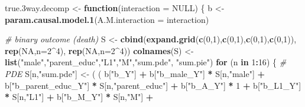 \documentclass[
]{book}
\newenvironment{Shaded}{\begin{snugshade}}{\end{snugshade}}
\newcommand{\AttributeTok}[1]{\textcolor[rgb]{0.13,0.29,0.53}{#1}}
\newcommand{\CommentTok}[1]{\textcolor[rgb]{0.56,0.35,0.01}{\textit{#1}}}
\newcommand{\ConstantTok}[1]{\textcolor[rgb]{0.56,0.35,0.01}{#1}}
\newcommand{\ControlFlowTok}[1]{\textcolor[rgb]{0.13,0.29,0.53}{\textbf{#1}}}
\newcommand{\DecValTok}[1]{\textcolor[rgb]{0.00,0.00,0.81}{#1}}
\newcommand{\FloatTok}[1]{\textcolor[rgb]{0.00,0.00,0.81}{#1}}
\newcommand{\FunctionTok}[1]{\textcolor[rgb]{0.13,0.29,0.53}{\textbf{#1}}}
\newcommand{\NormalTok}[1]{#1}
\newcommand{\OtherTok}[1]{\textcolor[rgb]{0.56,0.35,0.01}{#1}}
\newcommand{\SpecialCharTok}[1]{\textcolor[rgb]{0.81,0.36,0.00}{\textbf{#1}}}
\newcommand{\StringTok}[1]{\textcolor[rgb]{0.31,0.60,0.02}{#1}}
\begin{document}
\begin{Shaded}
\begin{Highlighting}[]
\NormalTok{true}\FloatTok{.3}\NormalTok{way.decomp }\OtherTok{\textless{}{-}} \ControlFlowTok{function}\NormalTok{(}\AttributeTok{interaction =} \ConstantTok{NULL}\NormalTok{) \{}
\NormalTok{  b }\OtherTok{\textless{}{-}} \FunctionTok{param.causal.model.1}\NormalTok{(}\AttributeTok{A.M.interaction =}\NormalTok{ interaction)}
  
  \CommentTok{\# binary outcome (death)}
\NormalTok{  S }\OtherTok{\textless{}{-}} \FunctionTok{cbind}\NormalTok{(}\FunctionTok{expand.grid}\NormalTok{(}\FunctionTok{c}\NormalTok{(}\DecValTok{0}\NormalTok{,}\DecValTok{1}\NormalTok{),}\FunctionTok{c}\NormalTok{(}\DecValTok{0}\NormalTok{,}\DecValTok{1}\NormalTok{),}\FunctionTok{c}\NormalTok{(}\DecValTok{0}\NormalTok{,}\DecValTok{1}\NormalTok{),}\FunctionTok{c}\NormalTok{(}\DecValTok{0}\NormalTok{,}\DecValTok{1}\NormalTok{)), }\FunctionTok{rep}\NormalTok{(}\ConstantTok{NA}\NormalTok{,}\AttributeTok{n=}\DecValTok{2}\SpecialCharTok{\^{}}\DecValTok{4}\NormalTok{), }\FunctionTok{rep}\NormalTok{(}\ConstantTok{NA}\NormalTok{,}\AttributeTok{n=}\DecValTok{2}\SpecialCharTok{\^{}}\DecValTok{4}\NormalTok{))}
  \FunctionTok{colnames}\NormalTok{(S) }\OtherTok{\textless{}{-}} \FunctionTok{list}\NormalTok{(}\StringTok{"male"}\NormalTok{,}\StringTok{"parent\_educ"}\NormalTok{,}\StringTok{"L1"}\NormalTok{,}\StringTok{"M"}\NormalTok{,}\StringTok{"sum.pde"}\NormalTok{, }\StringTok{"sum.pie"}\NormalTok{)}
  \ControlFlowTok{for}\NormalTok{ (n }\ControlFlowTok{in} \DecValTok{1}\SpecialCharTok{:}\DecValTok{16}\NormalTok{) \{}
    \CommentTok{\# PDE }
\NormalTok{    S[n,}\StringTok{"sum.pde"}\NormalTok{] }\OtherTok{\textless{}{-}}\NormalTok{ ( ( b[}\StringTok{"b\_Y"}\NormalTok{] }\SpecialCharTok{+} 
\NormalTok{                            b[}\StringTok{"b\_male\_Y"}\NormalTok{] }\SpecialCharTok{*}\NormalTok{ S[n,}\StringTok{"male"}\NormalTok{] }\SpecialCharTok{+} 
\NormalTok{                            b[}\StringTok{"b\_parent\_educ\_Y"}\NormalTok{] }\SpecialCharTok{*}\NormalTok{ S[n,}\StringTok{"parent\_educ"}\NormalTok{] }\SpecialCharTok{+} 
\NormalTok{                            b[}\StringTok{"b\_A\_Y"}\NormalTok{] }\SpecialCharTok{*} \DecValTok{1} \SpecialCharTok{+} 
\NormalTok{                            b[}\StringTok{"b\_L1\_Y"}\NormalTok{] }\SpecialCharTok{*}\NormalTok{ S[n,}\StringTok{"L1"}\NormalTok{] }\SpecialCharTok{+}
\NormalTok{                            b[}\StringTok{"b\_M\_Y"}\NormalTok{] }\SpecialCharTok{*}\NormalTok{ S[n,}\StringTok{"M"}\NormalTok{] }\SpecialCharTok{+}

\end{Highlighting}
\end{Shaded}
\end{document}
